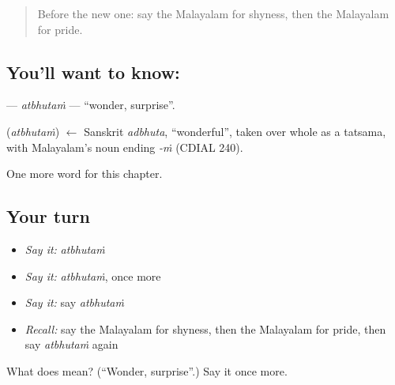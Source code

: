 \label{lesson:ML-C193-atbhutam}



\begin{quote}
Before the new one: say the Malayalam for shyness, then the Malayalam for pride.
\end{quote}

\subsection*{You'll want to know: }
\textbf{} — \emph{atbhutaṁ} — \textquotedblleft{}wonder, surprise\textquotedblright{}.

\begin{cousinweb}
\textbf{} (\emph{atbhutaṁ}) $\leftarrow$ Sanskrit \emph{adbhuta}, \textquotedblleft{}wonderful\textquotedblright{}, taken over whole as a tatsama, with Malayalam's noun ending \emph{-ṁ} (CDIAL 240).
\end{cousinweb}

\begin{grammarlens}[title={What you've built}]
One more word for this chapter.
\end{grammarlens}

\subsection*{Your turn}
\begin{itemize}
\raggedright
  \item \emph{Say it:} \emph{atbhutaṁ}
  \item \emph{Say it:} \emph{atbhutaṁ}, once more
  \item \emph{Say it:} say \emph{atbhutaṁ}
  \item \emph{Recall:} say the Malayalam for shyness, then the Malayalam for pride, then say \emph{atbhutaṁ} again
\end{itemize}

\begin{tcolorbox}[breakable,colback=teal!4,colframe=teal!35!black,title={Before you move on}]
What does  mean? (\textquotedblleft{}Wonder, surprise\textquotedblright{}.) Say it once more.
\end{tcolorbox}
